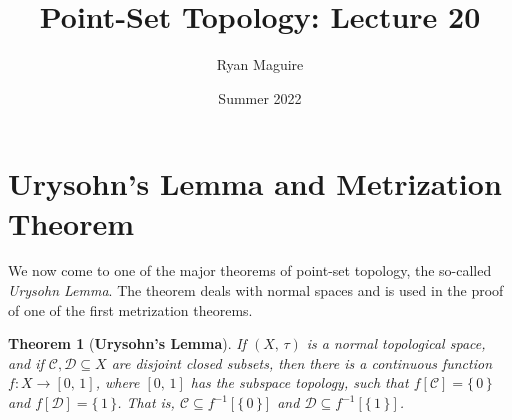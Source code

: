 \documentclass{article}
\title{Point-Set Topology: Lecture 20}
\author{Ryan Maguire}
\date{Summer 2022}
\theoremstyle{plain}
\newtheorem{theorem}{Theorem}[section]
\theoremstyle{normal}
\begin{document}
    \maketitle
    \section{Urysohn's Lemma and Metrization Theorem}
        We now come to one of the major theorems of point-set topology, the
        so-called \textit{Urysohn Lemma}. The theorem deals with normal spaces
        and is used in the proof of one of the first metrization theorems.
        \begin{theorem}[\textbf{Urysohn's Lemma}]
            If $(X,\,\tau)$ is a normal topological space, and if
            $\mathcal{C},\mathcal{D}\subseteq{X}$ are disjoint closed subsets,
            then there is a continuous function
            $f:X\rightarrow[0,\,1]$, where $[0,\,1]$ has the subspace topology,
            such that $f[\mathcal{C}]=\{\,0\,\}$ and
            $f[\mathcal{D}]=\{\,1\,\}$. That is,
            $\mathcal{C}\subseteq{f}^{-1}[\{\,0\,\}]$ and
            $\mathcal{D}\subseteq{f}^{-1}[\{\,1\,\}]$.
        \end{theorem}
\end{document}
